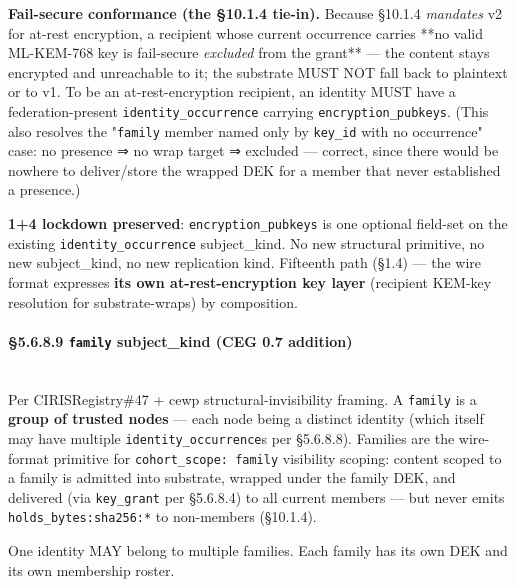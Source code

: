 \documentclass[10pt]{article}
\begin{document}
\textbf{Fail-secure conformance (the §10.1.4 tie-in).} Because §10.1.4 \textit{mandates} v2 for at-rest encryption, a recipient whose current occurrence carries **no valid ML-KEM-768 key is fail-secure \textit{excluded} from the grant** — the content stays encrypted and unreachable to it; the substrate MUST NOT fall back to plaintext or to v1. To be an at-rest-encryption recipient, an identity MUST have a federation-present \texttt{identity\_occurrence} carrying \texttt{encryption\_pubkeys}. (This also resolves the "\texttt{family} member named only by \texttt{key\_id} with no occurrence" case: no presence ⇒ no wrap target ⇒ excluded — correct, since there would be nowhere to deliver/store the wrapped DEK for a member that never established a presence.)


\textbf{1+4 lockdown preserved}: \texttt{encryption\_pubkeys} is one optional field-set on the existing \texttt{identity\_occurrence} subject\_kind. No new structural primitive, no new subject\_kind, no new replication kind. Fifteenth path (§1.4) — the wire format expresses \textbf{its own at-rest-encryption key layer} (recipient KEM-key resolution for substrate-wraps) by composition.


\paragraph{§5.6.8.9 \texttt{family} subject\_kind (CEG 0.7 addition)}\mbox{}\\


Per CIRISRegistry\#47 + cewp structural-invisibility framing. A \texttt{family} is a \textbf{group of trusted nodes} — each node being a distinct identity (which itself may have multiple \texttt{identity\_occurrence}s per §5.6.8.8). Families are the wire-format primitive for \texttt{cohort\_scope: family} visibility scoping: content scoped to a family is admitted into substrate, wrapped under the family DEK, and delivered (via \texttt{key\_grant} per §5.6.8.4) to all current members — but never emits \texttt{holds\_bytes:sha256:*} to non-members (§10.1.4).


One identity MAY belong to multiple families. Each family has its own DEK and its own membership roster.
\end{document}
